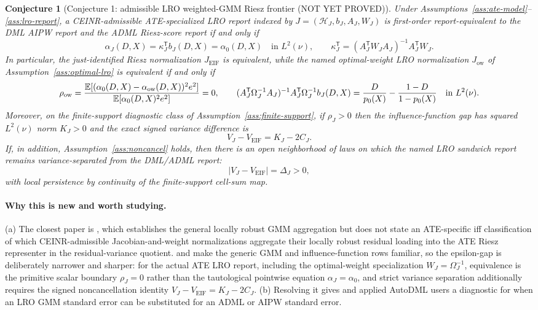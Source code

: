 \documentclass[11pt]{article}
\newcommand{\E}{\mathbb{E}}
\newcommand{\transpose}{\mathsf{T}}
\theoremstyle{definition}
\theoremstyle{plain}
\newtheorem{conjecture}{Conjecture}
\theoremstyle{remark}
\begin{document}
\begin{conjecture}[Conjecture 1: admissible LRO weighted-GMM Riesz frontier (NOT YET PROVED)]\label{conj:lro-iff}
Under Assumptions~\ref{ass:ate-model}--\ref{ass:lro-report}, a CEINR-admissible ATE-specialized LRO report indexed by $J=(\mathcal H_J,b_J,A_J,W_J)$ is first-order report-equivalent to the DML AIPW report and the ADML Riesz-score report if and only if
\[
  \alpha_J(D,X)=\kappa_J^\transpose b_J(D,X)=\alpha_0(D,X)\quad\text{in }L^2(\nu),
  \qquad
  \kappa_J^\transpose=(A_J^\transpose W_JA_J)^{-1}A_J^\transpose W_J.
\]
In particular, the just-identified Riesz normalization $J_{\mathrm{EIF}}$ is equivalent, while the named optimal-weight LRO normalization $J_{\mathrm{ow}}$ of Assumption~\ref{ass:optimal-lro} is equivalent if and only if
\[
  \rho_{\mathrm{ow}}={\E[(\alpha_0(D,X)-\alpha_{\mathrm{ow}}(D,X))^2e^2]\over \E[\alpha_0(D,X)^2e^2]}=0,
  \qquad
  (A_J^\transpose\Omega_J^{-1}A_J)^{-1}A_J^\transpose\Omega_J^{-1}b_J(D,X)
  =
  \frac{D}{p_0(X)}-\frac{1-D}{1-p_0(X)}
  \quad\text{in }L^2(\nu).
\]
Moreover, on the finite-support diagnostic class of Assumption~\ref{ass:finite-support}, if $\rho_J>0$ then the influence-function gap has squared $L^2(\nu)$ norm $K_J>0$ and the exact signed variance difference is
\[
  V_J - V_{\mathrm{EIF}} = K_J - 2C_J.
\]
If, in addition, Assumption~\ref{ass:noncancel} holds, then there is an open neighborhood of laws on which the named LRO sandwich report remains variance-separated from the DML/ADML report:
\[
  |V_J - V_{\mathrm{EIF}}|=\Delta_J>0,
\]
with local persistence by continuity of the finite-support cell-sum map.
\end{conjecture}
\paragraph{Why this is new and worth studying.}
(a) The closest paper is \citet{ChernozhukovEscancianoIchimuraNeweyRobins2022LRO}, which establishes the general locally robust GMM aggregation but does not state an ATE-specific iff classification of which CEINR-admissible Jacobian-and-weight normalizations aggregate their locally robust residual loading into the ATE Riesz representer in the residual-variance quotient.  \citet{Hansen1982Econometrica} and \citet{IchimuraNewey2022QE} make the generic GMM and influence-function rows familiar, so the epsilon-gap is deliberately narrower and sharper: for the actual ATE LRO report, including the optimal-weight specialization $W_J=\Omega_J^{-1}$, equivalence is the primitive scalar boundary $\rho_J=0$ rather than the tautological pointwise equation $\alpha_J=\alpha_0$, and strict variance separation additionally requires the signed noncancellation identity $V_J-V_{\mathrm{EIF}}=K_J-2C_J$.  (b) Resolving it gives \citet{BrunsSmithDukesFellerOgburn2025JRSSB} and applied AutoDML users a diagnostic for when an LRO GMM standard error can be substituted for an ADML or AIPW standard error.
\end{document}
